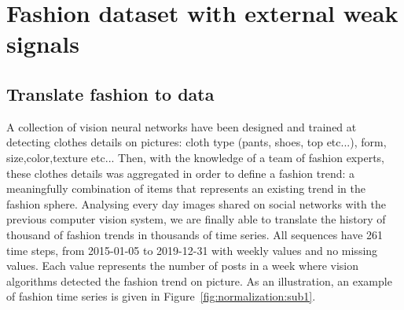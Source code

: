 \documentclass{article} %
\newcommand{\numberts}{10000}
\begin{document}
\section{Fashion dataset with external weak signals}
\label{sec:dataset}


\subsection{Translate fashion to data}

A collection of vision neural networks have been designed and trained  at detecting clothes details on pictures: cloth type (pants, shoes, top etc...), form, size,color,texture etc... Then, with the knowledge of a team of fashion experts, these clothes details was aggregated in order to define a fashion trend: a meaningfully combination of items that represents an existing trend in the fashion sphere. Analysing every day images shared on social networks with the previous computer vision system, we are finally able to translate the history of thousand of fashion trends in thousands of time series. All sequences have 261 time steps, from 2015-01-05 to 2019-12-31 with weekly values and no missing values. Each value represents the number of posts in a week where vision algorithms detected the fashion trend on picture. As an illustration, an example of fashion time series is given in Figure~\ref{fig:normalization:sub1}.
\end{document}
